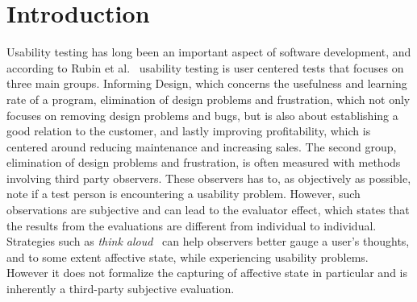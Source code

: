 
\section{Introduction}

Usability testing has long been an important aspect of software development, and according to Rubin et al.~\cite{rubin2008handbook} usability testing is user centered tests that focuses on three main groups.
Informing Design, which concerns the usefulness and learning rate of a program,
elimination of design problems and frustration, which not only focuses on removing design problems and bugs, but is also about establishing a good relation to the customer, and lastly improving profitability, which is centered around reducing maintenance and increasing sales.
The second group, elimination of design problems and frustration, is often measured with methods involving third party observers.
These observers has to, as objectively as possible, note if a test person is encountering a usability problem.
However, such observations are subjective and can lead to the evaluator effect\cite{eval_effect}, which states that the results from the evaluations are different from individual to individual.
Strategies such as \textit{think aloud}~\cite{use_of_TA_and_IDA} can help observers better gauge a user's
thoughts, and to some extent affective state, while experiencing usability problems. However it does
not formalize the capturing of affective state in particular and is inherently a third-party
subjective evaluation. 

